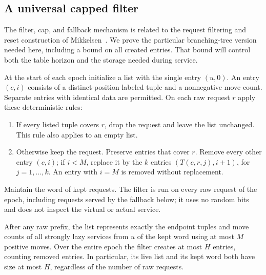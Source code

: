 \subsection{A universal capped filter}

The filter, cap, and fallback mechanism is related to the request filtering
and reset construction of Mikkelsen~\cite[Section~5.2,
Lemmas~8--9]{Mikkelsen2016}. We prove the particular branching-tree version
needed here, including a bound on all created entries. That bound will
control both the table horizon and the storage needed during service.

At the start of each epoch initialize a list with the single entry
$(u,0)$.  An entry $(c,i)$ consists of a distinct-position labeled tuple
and a nonnegative move count.  Separate entries with identical data are
permitted.  On each raw request $r$ apply these deterministic rules:
\begin{enumerate}[label=(\roman*),leftmargin=*]
\item If every listed tuple covers $r$, drop the request and leave the
list unchanged.  This rule also applies to an empty list.
\item Otherwise keep the request.  Preserve entries that cover $r$.
Remove every other entry $(c,i)$; if $i<M$, replace it by the $k$ entries
$(T(c,r,j),i+1)$, for $j=1,\ldots,k$.  An entry with $i=M$ is removed
without replacement.
\end{enumerate}
Maintain the word of kept requests.  The filter is run on every raw
request of the epoch, including requests served by the fallback below;
it uses no random bits and does not inspect the virtual or actual service.

\begin{lemma}\label{lem:filter}
After any raw prefix, the list represents exactly the endpoint tuples
and move counts of all strongly lazy services from $u$ of the kept word
using at most $M$ positive moves.  Over the entire epoch the filter creates
at most $H$ entries, counting removed entries.  In particular, its live
list and its kept word both have size at most $H$, regardless of the
number of raw requests.
\end{lemma}

